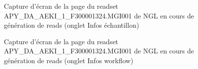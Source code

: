 \begin{figure}[H]
    \centering
    \caption{\footnotesize{Capture d'écran de la page du readset APY\_DA\_AEKI\_1\_F300001324.MGI001 de NGL en cours de génération de reads (onglet \og Infos échantillon\fg{})}}
    \label{infos-sample-readset}
\end{figure}
\begin{figure}[H]
    \centering
    \caption{\footnotesize{Capture d'écran de la page du readset APY\_DA\_AEKI\_1\_F300001324.MGI001 de NGL en cours de génération de reads (onglet \og Infos workflow\fg{})}}
    \label{infos-workflow-readset}
\end{figure}